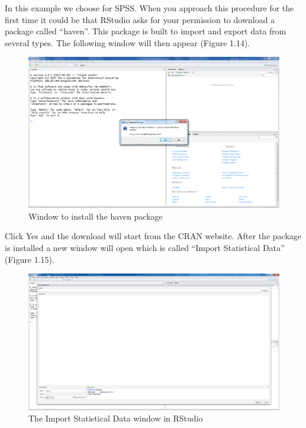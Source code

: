 \documentclass[]{book}
\theoremstyle{definition}
\theoremstyle{definition}
\theoremstyle{definition}
\theoremstyle{remark}
\begin{document}
In this example we choose for SPSS. When you approach this procedure for
the first time it could be that RStudio asks for your permission to
download a package called ``haven''. This package is built to import and
export data from several types. The following window will then appear
(Figure 1.14).

\begin{figure}

{\centering \includegraphics[width=0.9\linewidth]{images/fig1.14} 

}

\caption{Window to install the haven package}\label{fig:fig14}
\end{figure}

Click Yes and the download will start from the CRAN website. After the
package is installed a new window will open which is called ``Import
Statistical Data'' (Figure 1.15).

\begin{figure}

{\centering \includegraphics[width=0.9\linewidth]{images/fig1.15} 

}

\caption{The Import Statistical Data window in RStudio}\label{fig:fig15}
\end{figure}
\end{document}
